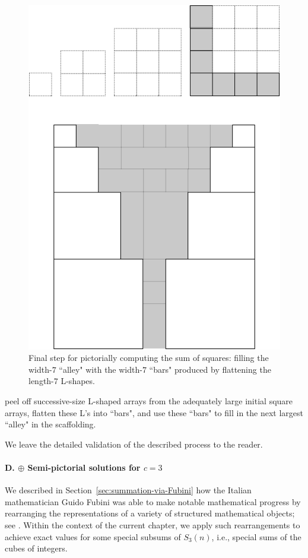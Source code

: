 \begin{figure}[ht]
\begin{center}
       \includegraphics[scale=0.3]{FiguresMaths/SumSquares5}
\caption{Final step for pictorially computing the sum of squares: filling the width-$7$ ``alley" with the width-$7$ ``bars" produced by flattening the length-$7$ L-shapes.}
       \label{fig:sumSquares5}
\end{center}
\end{figure}
peel off successive-size L-shaped arrays from the adequately large initial square arrays, flatten these L's into ``bars", and use these ``bars" to fill in the next largest ``alley" in the scaffolding.

\medskip

We leave the detailed validation of the described process to the reader.

\paragraph{D. $\oplus$ Semi-pictorial solutions for $c=3$}

We described in Section~\ref{sec:summation-via-Fubini} how the Italian mathematician Guido Fubini was able to make notable mathematical progress by rearranging the representations of a variety of structured mathematical objects; see \cite{Fubini}.  Within the context of the current chapter, we apply such rearrangements to achieve exact values for some special subsums of $S_3(n)$, i.e., special sums of the cubes of integers.

